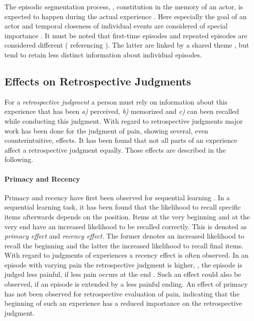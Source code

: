 The episodic segmentation process, \ie, constitution in the memory of an actor, is expected to happen during the actual experience \citep[\cf,][]{ezzyat_what_2011, kurby_segmentation_2008}.
Here especially the goal of an actor and temporal closeness of individual events are considered of special importance \citep[\cf,][]{black_episodes_1979}.
It must be noted that first-time episodes and repeated episodes are considered different (\citet{conway_construction_2000} referencing \citet{barsalou_content_1988}).
The latter are linked by a shared theme \citep{robinson_first_1992}, but tend to retain less distinct information about individual episodes.

\subsection{Effects on Retrospective Judgments}
For a \emph{retrospective judgment} a person must rely on information about this experience that has been \emph{a)} perceived, \emph{b)} memorized and \emph{c)} can been recalled while conducting this judgment.
With regard to retrospective judgments major work has been done for the judgment of pain, showing several, even counterintuitive, effects.
It has been found that not all parts of an experience affect a retrospective judgment equally.
Those effects are described in the following.

\paragraph*{Primacy and Recency}
Primacy and recency have first been observed for sequential learning \citep[\cf,][]{murdock_jr._serial_1962}.
In a sequential learning task, it has been found that the likelihood to recall specific items afterwards depends on the position.
Items at the very beginning and at the very end have an increased likelihood to be recalled correctly.
This is denoted as \emph{primacy effect} and \emph{recency effect}.
The former denotes an increased likelihood to recall the beginning and the latter the increased likelihood to recall final items.
With regard to judgments of experiences a recency effect is often observed.
In an episode with varying pain the retrospective judgment is higher, \ie, the episode is judged less painful, if less pain occurs at the end \citep[\cf,][]{kahneman_when_1993, redelmeier_patients_1996}.
Such an effect could also be observed, if an episode is extended by a less painful ending.
An effect of primacy has not been observed for retrospective evaluation of pain, indicating that the beginning of such an experience has a reduced importance on the retrospective judgment.

